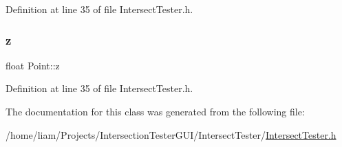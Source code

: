 Definition at line 35 of file Intersect\+Tester.\+h.

\mbox{\label{class_point_a9a666531e0e99adff132be93d2407d0c}} 
\subsubsection{\texorpdfstring{z}{z}}
{\footnotesize\ttfamily float Point\+::z}



Definition at line 35 of file Intersect\+Tester.\+h.



The documentation for this class was generated from the following file\+:\begin{DoxyCompactItemize}
\item 
/home/liam/\+Projects/\+Intersection\+Tester\+G\+U\+I/\+Intersect\+Tester/\hyperlink{_intersect_tester_8h}{Intersect\+Tester.\+h}\end{DoxyCompactItemize}
